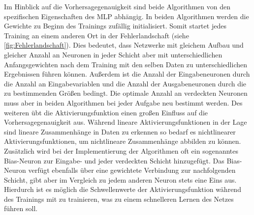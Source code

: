 Im Hinblick auf die Vorhersagegenauigkeit sind beide Algorithmen von den spezifischen Eigenschaften des MLP abhängig. In beiden Algorithmen werden die Gewichte zu Beginn des Trainings zufällig initialisiert. Somit startet jedes Training an einem anderen Ort in der Fehlerlandschaft (siehe \autoref{fig:Fehlerlandschaft}). Dies bedeutet, dass Netzwerke mit gleichem Aufbau und gleicher Anzahl an Neuronen in jeder Schicht aber mit unterschiedlichen Anfangsgewichten nach dem Training mit den selben Daten zu unterschiedlichen Ergebnissen führen können. Außerdem ist die Anzahl der Eingabeneuronen durch die Anzahl an Eingabevariablen und die Anzahl der Ausgabeneuronen durch die zu bestimmenden Größen bedingt. Die optimale Anzahl an verdeckten Neuronen muss aber in beiden Algorithmen bei jeder Aufgabe neu bestimmt werden. Des weiteren übt die Aktivierungsfunktion einen großen Einfluss auf die Vorhersagegenauigkeit aus. Während lineare Aktivierungsfunktionen in der Lage sind lineare Zusammenhänge in Daten zu erkennen so bedarf es nichtlinearer Aktivierungsfunktionen, um nichtlineare Zusammenhänge abbilden zu können.\, Zusätzlich wird bei der Implementierung der Algorithmen oft ein sogenanntes Bias-Neuron zur Eingabe- und jeder verdeckten Schicht hinzugefügt. Das Bias-Neuron verfügt ebenfalls über eine gewichtete Verbindung zur nachfolgenden Schicht, gibt aber im Vergleich zu jedem anderen Neuron stets eine Eins aus. Hierdurch ist es möglich die Schwellenwerte der Aktivierungsfunktion während des Trainings mit zu trainieren, was zu einem schnelleren Lernen des Netzes führen soll.\,